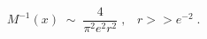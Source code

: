 \begin{equation}\label{eq:big}
M^{-1}(x) \;\sim \; \frac{4}{\pi^2 e^2 r^2} \;,\;\;\; r >> e^{-2}\;. 
\end{equation}

